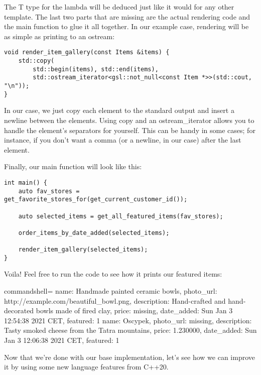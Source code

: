 The T type for the lambda will be deduced just like it would for any other template. The last two parts that are missing are the actual rendering code and the main function to glue it all together. In our example case, rendering will be as simple as printing to an ostream:

\begin{lstlisting}[style=styleCXX]
void render_item_gallery(const Items &items) {
	std::copy(
		std::begin(items), std::end(items),
		std::ostream_iterator<gsl::not_null<const Item *>>(std::cout, "\n"));
}
\end{lstlisting}

In our case, we just copy each element to the standard output and insert a newline between the elements. Using copy and an ostream\_iterator allows you to handle the element's separators for yourself. This can be handy in some cases; for instance, if you don't want a comma (or a newline, in our case) after the last element.

Finally, our main function will look like this:

\begin{lstlisting}[style=styleCXX]
int main() {
	auto fav_stores = get_favorite_stores_for(get_current_customer_id());
	
	auto selected_items = get_all_featured_items(fav_stores);
	
	order_items_by_date_added(selected_items);
	
	render_item_gallery(selected_items);
}
\end{lstlisting}

Voila! Feel free to run the code to see how it prints our featured items:

\begin{tcblisting}{commandshell={}}
name: Handmade painted ceramic bowls, photo_url:
http://example.com/beautiful_bowl.png, description: Hand-crafted and hand-
decorated bowls made of fired clay, price: missing, date_added: Sun Jan 3
12:54:38 2021 CET, featured: 1
name: Oscypek, photo_url: missing, description: Tasty smoked cheese from
the Tatra mountains, price: 1.230000, date_added: Sun Jan 3 12:06:38 2021
CET, featured: 1
\end{tcblisting}

Now that we're done with our base implementation, let's see how we can improve it by using some new language features from C++20.



